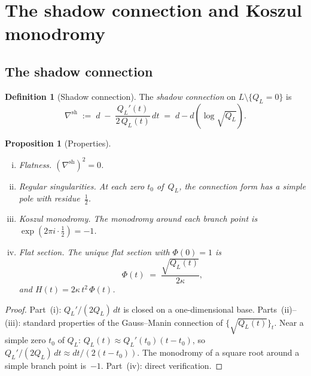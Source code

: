 \documentclass[11pt,reqno]{amsart}
\newtheorem{proposition}[theorem]{Proposition}
\theoremstyle{definition}
\newtheorem{definition}[theorem]{Definition}
\theoremstyle{remark}
\numberwithin{equation}{section}
\begin{document}

\section{The shadow connection and Koszul
monodromy}\label{sec:connection}

\subsection{The shadow connection}\label{subsec:conn}

\begin{definition}[Shadow
connection]\label{def:shadow-conn}
The \emph{shadow connection} on
$L \setminus \{Q_L = 0\}$ is
\begin{equation}\label{eq:shadow-conn}
 \nabla^{\mathrm{sh}}
 \;:=\;
 d \;-\; \frac{Q_L'(t)}{2\,Q_L(t)}\,dt
 \;=\;
 d - d\!\left(\log\sqrt{Q_L}\right).
\end{equation}
\end{definition}

\begin{proposition}[Properties]\label{prop:conn-properties}
\leavevmode
\begin{enumerate}[(i)]
\item \emph{Flatness.}\enspace
 $(\nabla^{\mathrm{sh}})^2 = 0$.

\item \emph{Regular singularities.}\enspace
 At each zero $t_0$ of~$Q_L$, the connection form has a
 simple pole with residue~$\frac{1}{2}$.

\item \emph{Koszul monodromy.}\enspace
 The monodromy around each branch point is
 $\exp(2\pi i \cdot \frac{1}{2}) = -1$.

\item \emph{Flat section.}\enspace
 The unique flat section with $\Phi(0) = 1$ is
 \begin{equation}\label{eq:flat-section}
  \Phi(t)
  \;=\;
  \frac{\sqrt{Q_L(t)}}{2\kappa},
 \end{equation}
 and
 $H(t) = 2\kappa\, t^2\, \Phi(t)$.
\end{enumerate}
\end{proposition}

\begin{proof}
Part~(i): $Q_L'/(2Q_L)\, dt$ is closed on a
one-dimensional base. Parts~(ii)--(iii): standard
properties of the Gauss--Manin connection of
$\{\sqrt{Q_L(t)}\}_t$. Near a simple zero $t_0$ of $Q_L$:
$Q_L(t) \approx Q_L'(t_0)(t - t_0)$, so
$Q_L'/(2Q_L)\, dt \approx dt/(2(t - t_0))$. The monodromy
of a square root around a simple branch point is~$-1$.
Part~(iv): direct verification.
\end{proof}
\end{document}
